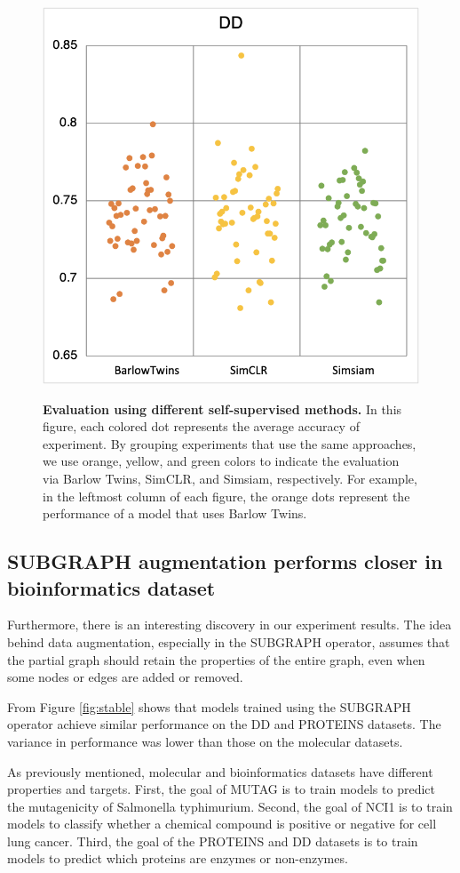 \begin{figure}
{        %
        \includegraphics[width = .48\linewidth]{./figures/1-DD.png}}
\vspace{0.5cm}
\caption[Evaluation using different self-supervised methods]{\textbf{Evaluation using different self-supervised methods.} In this figure, each colored dot represents the average accuracy of experiment. By grouping experiments that use the same approaches, we use orange, yellow, and green colors to indicate the evaluation via Barlow Twins, SimCLR, and Simsiam, respectively. For example, in the leftmost column of each figure, the orange dots represent the performance of a model that uses Barlow Twins.}
\label{fig:simclrbetter}
\end{figure}



\subsection{SUBGRAPH augmentation performs closer in bioinformatics dataset}


Furthermore, there is an interesting discovery in our experiment results. The idea behind data augmentation, especially in the SUBGRAPH operator, assumes that the partial graph should retain the properties of the entire graph, even when some nodes or edges are added or removed.  

From Figure \ref{fig:stable} shows that models trained using the SUBGRAPH operator achieve similar performance on the DD and PROTEINS datasets. The variance in performance was lower than those on the molecular datasets.



As previously mentioned, molecular and bioinformatics datasets have different properties and targets. First, the goal of MUTAG is to train models to predict the mutagenicity of Salmonella typhimurium. Second, the goal of NCI1 is to train models to classify whether a chemical compound is positive or negative for cell lung cancer. Third, the goal of the PROTEINS and DD datasets is to train models to predict which proteins are enzymes or non-enzymes.

